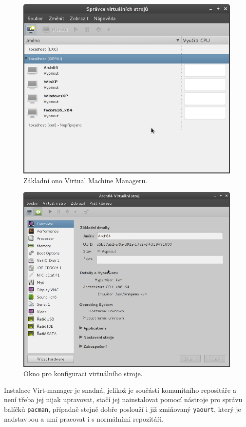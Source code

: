 \begin{figure}[h!]
  \centering
  \includegraphics[width=12cm]{obr/vmm}
  \caption{Základní ono Virtual Machine Manageru.}
  \label{obr:vmm}
\end{figure}
\begin{figure}[h!]
  \centering
  \includegraphics[width=12cm]{obr/vmmc}
  \caption{Okno pro konfiguraci virtuálního stroje.}
  \label{obr:vmmc}
\end{figure}

Instalace Virt-manager je snadná, jelikož je součástí komunitního repositáře a není třeba jej nijak upravovat, stačí jej nainstalovat pomocí nástroje pro správu balíčků \texttt{pacman}, případně stejně dobře poslouží i již zmiňovaný \texttt{yaourt}, který je nadstavbou a umí pracovat i s normálními repozitáři.
